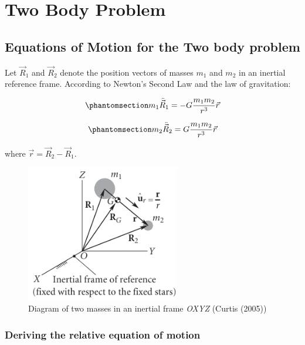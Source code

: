 \documentclass[
  letterpaper,
  DIV=11,
  numbers=noendperiod]{scrreprt}
\begin{document}

\chapter{Two Body Problem}\label{two-body-problem}

\section{Equations of Motion for the Two body
problem}\label{equations-of-motion-for-the-two-body-problem}

Let \(\vec{R}_1\) and \(\vec{R}_2\) denote the position vectors of
masses \(m_1\) and \(m_2\) in an inertial reference frame. According to
Newton's Second Law and the law of gravitation:

\begin{equation}\phantomsection\label{eq-f12}{
m_1\ddot{\vec{R}}_1=-G\frac{m_1 m_2}{r^3} \vec{r}
}\end{equation}

\begin{equation}\phantomsection\label{eq-f21}{
m_2\ddot{\vec{R}}_2=G\frac{m_1 m_2}{r^3} \vec{r}
}\end{equation}

where \(\vec{r}= \vec{R}_2-\vec{R}_1\).

\begin{figure}[H]

{\centering \includegraphics[width=2.63542in,height=\textheight,keepaspectratio]{fig2_1.jpeg}

}

\caption{Diagram of two masses in an inertial frame \emph{OXYZ} (Curtis
(2005))}

\end{figure}%

\subsection{Deriving the relative equation of
motion}\label{deriving-the-relative-equation-of-motion}
\end{document}
